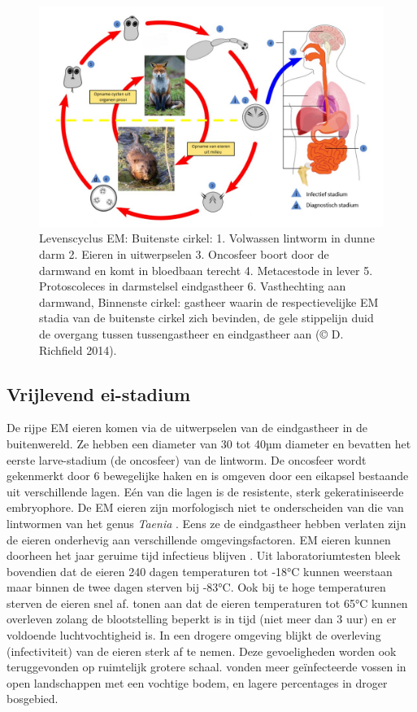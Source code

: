 \documentclass[twoside]{extreport}
\begin{document}
\begin{figure}

{\centering \includegraphics[width=1\linewidth]{col} 

}

\caption{Levenscyclus EM: Buitenste cirkel: 1. Volwassen
lintworm in dunne darm 2. Eieren in uitwerpselen 3. Oncosfeer boort door
de darmwand en komt in bloedbaan terecht 4. Metacestode in lever 5.
Protoscoleces in darmstelsel eindgastheer 6. Vasthechting aan darmwand,
Binnenste cirkel: gastheer waarin de respectievelijke EM stadia van de
buitenste cirkel zich bevinden, de gele stippelijn duid de overgang
tussen tussengastheer en eindgastheer aan (© D. Richfield 2014).}\label{fig:Levenscyclus}
\end{figure}

\subsection{Vrijlevend ei-stadium}\label{vrijlevend-ei-stadium}

De rijpe EM eieren komen via de uitwerpselen van de eindgastheer in de
buitenwereld. Ze hebben een diameter van 30 tot 40µm diameter en
bevatten het eerste larve-stadium (de oncosfeer) van de lintworm. De
oncosfeer wordt gekenmerkt door 6 bewegelijke haken en is omgeven door
een eikapsel bestaande uit verschillende lagen. Eén van die lagen is de
resistente, sterk gekeratiniseerde embryophore. De EM eieren zijn
morfologisch niet te onderscheiden van die van lintwormen van het genus
\emph{Taenia} \citep{eckert2001oie}. Eens ze de eindgastheer hebben
verlaten zijn de eieren onderhevig aan verschillende omgevingsfactoren.
EM eieren kunnen doorheen het jaar geruime tijd infectieus blijven
\citep{veit1995influence}. Uit laboratoriumtesten bleek bovendien dat de
eieren 240 dagen temperaturen tot -18°C kunnen weerstaan maar binnen de
twee dagen sterven bij -83°C. Ook bij te hoge temperaturen sterven de
eieren snel af. \citet{federer2015vivo} tonen aan dat de eieren
temperaturen tot 65°C kunnen overleven zolang de blootstelling beperkt
is in tijd (niet meer dan 3 uur) en er voldoende luchtvochtigheid is. In
een drogere omgeving blijkt de overleving (infectiviteit) van de eieren
sterk af te nemen. Deze gevoeligheden worden ook teruggevonden op
ruimtelijk grotere schaal. \citet{staubach2001geographic} vonden meer
geïnfecteerde vossen in open landschappen met een vochtige bodem, en
lagere percentages in droger bosgebied.
\end{document}
